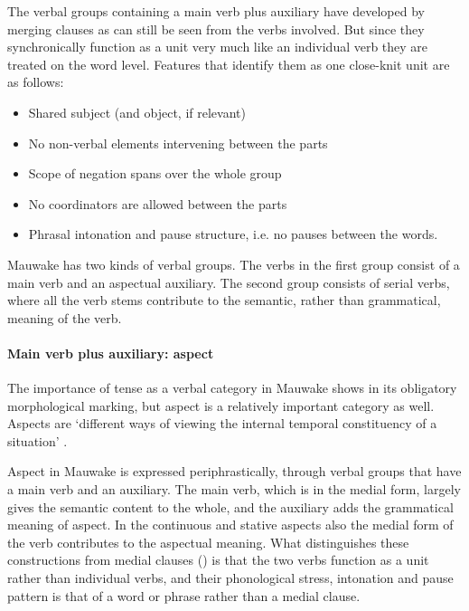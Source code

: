 The verbal groups containing a main verb plus auxiliary have developed by merging clauses as can still be seen from the verbs involved. But since they synchronically function as a unit very much like an individual verb they are treated on the word level. Features that identify them as one close-knit unit are as follows:

\begin{itemize}
\item Shared subject (and object, if relevant)
\item No non-verbal elements intervening between the parts
\item Scope of negation spans over the whole group
\item No coordinators are allowed between the parts
\item Phrasal intonation and pause structure, i.e. no pauses between the words.
\end{itemize}

Mauwake has two kinds of verbal groups. The verbs in the first group consist of a main verb and an aspectual auxiliary. The second group consists of serial verbs, where all the verb stems contribute to the semantic, rather than grammatical, meaning of the verb.

\paragraph{Main verb plus auxiliary: aspect}\label{sec:3.8.5.1.1}
{}
The importance of tense as a verbal category in Mauwake shows in its obligatory morphological marking, but aspect is a relatively important category as well. Aspects are `{different ways of viewing the internal temporal constituency of a situation}' \citep[3]{Comrie1976}. 

Aspect in Mauwake is expressed periphrastically, through verbal groups that have a main verb and an auxiliary. The main verb, which is in the medial form, largely gives the semantic content to the whole, and the auxiliary adds the grammatical meaning of aspect. In the continuous and stative aspects also the medial form of the  verb contributes to the aspectual meaning. What distinguishes these constructions from medial clauses () is that the two verbs function as a unit rather than individual verbs, and their phonological stress, intonation and pause pattern is that of a word or phrase rather than a medial clause. 

